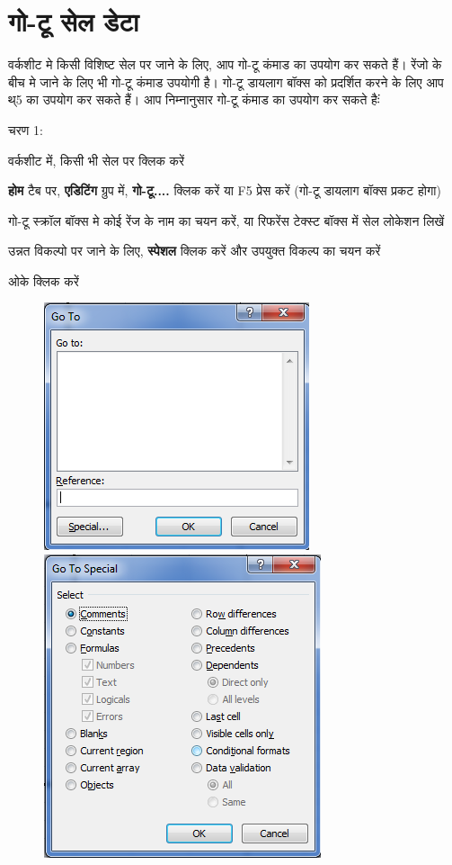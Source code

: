 \section{गो-टू सेल डेटा}\label{id-1.37}

वर्कशीट मे किसी विशिष्ट सेल पर जाने के लिए, आप गो-टू कंमाड का उपयोग कर सकते हैं। रेंजो के बीच मे जाने के लिए भी गो-टू कंमाड उपयोगी है। गो-टू डायलाग बॉक्स को प्रदर्शित करने के लिए आप थ्5 का उपयोग कर सकते हैं। आप निम्नानुसार गो-टू कंमाड का उपयोग कर सकते हैःं

\begin{descriptionSimple}{चरण 1:}
\item[चरण 1] वर्कशीट में, किसी भी सेल पर क्लिक करें
\item[चरण 2] \textbf{होम} टैब पर, \textbf{एडिटिंग} ग्रुप में, \textbf{गो-टू....} क्लिक करें या  {\eng F5}  प्रेस करें (गो-टू डायलाग बॉक्स प्रकट होगा)
\item[चरण 3] गो-टू स्क्रॉल बॉक्स मे कोई रेंज के नाम का चयन करें, या रिफरेंस टेक्स्ट बॉक्स में सेल लोकेशन लिखें
\item[चरण 4] उन्नत विकल्पो पर जाने के लिए, \textbf{स्पेशल} क्लिक करें और उपयुक्त विकल्प का चयन करें
\item[चरण 5] ओके क्लिक करें
\end{descriptionSimple}
\begin{figure}[H]
\centering
\includegraphics[scale=0.45]{src/images/chapter1/chapter1_fig59.png}\qquad
\includegraphics[scale=0.45]{src/images/chapter1/chapter1_fig60.png}
\end{figure}				

